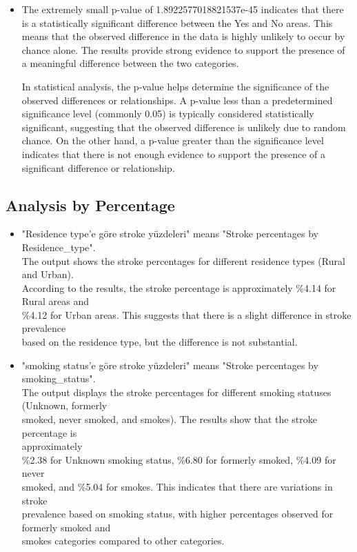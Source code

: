 \documentclass{article}
\begin{document}
\begin{titlepage}
\begin{itemize}
\item The extremely small p-value of 1.8922577018821537e-45 indicates that there is a statistically significant difference between the Yes and No areas. This means that the observed difference in the data is highly unlikely to occur by chance alone. The results provide strong evidence to support the presence of a meaningful difference between the two categories.

In statistical analysis, the p-value helps determine the significance of the observed differences or relationships. A p-value less than a predetermined significance level (commonly 0.05) is typically considered statistically significant, suggesting that the observed difference is unlikely due to random chance. On the other hand, a p-value greater than the significance level indicates that there is not enough evidence to support the presence of a significant difference or relationship.

\end{itemize}

\subsection{Analysis by Percentage}
\label{headings}
\begin{itemize}

\item "Residence type'e göre stroke yüzdeleri" means "Stroke percentages by Residence_type".\\ The output shows the stroke percentages for different residence types (Rural and Urban).\\ According to the results, the stroke percentage is approximately \%4.14 for Rural areas and\\ \%4.12 for Urban areas. This suggests that there is a slight difference in stroke prevalence\\ based on the residence type, but the difference is not substantial.\\

\item "smoking status'e göre stroke yüzdeleri" means "Stroke percentages by smoking_status".\\ The output displays the stroke percentages for different smoking statuses (Unknown, formerly\\ smoked, never smoked, and smokes). The results show that the stroke percentage is\\ approximately\\ \%2.38 for Unknown smoking status, \%6.80 for formerly smoked, \%4.09 for never\\ smoked, and \%5.04 for smokes. This indicates that there are variations in stroke\\ prevalence  based on smoking status, with higher percentages observed for formerly smoked and\\ smokes categories compared to other categories.


\end{itemize}
\end{titlepage}
\end{document}

